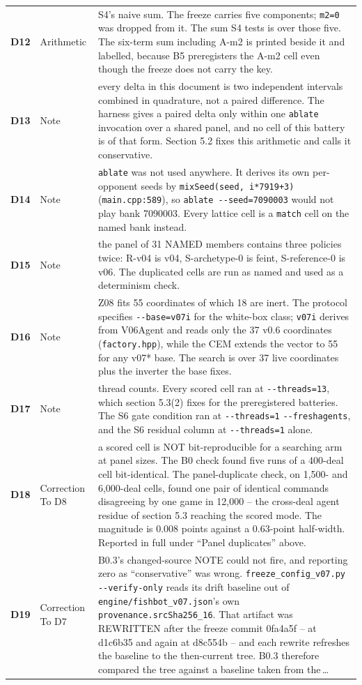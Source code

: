 \begin{xltabular}{\linewidth}{@{}l l L@{}}
\textbf{D12} & Arithmetic & S4's naive sum. The freeze carries five components; \texttt{m2=0} was dropped from it. The sum S4 tests is over those five. The six-term sum including A-m2 is printed beside it and labelled, because B5 preregisters the A-m2 cell even though the freeze does not carry the key. \\
\textbf{D13} & Note & every delta in this document is two independent intervals combined in quadrature, not a paired difference. The harness gives a paired delta only within one \texttt{ablate} invocation over a shared panel, and no cell of this battery is of that form. Section 5.2 fixes this arithmetic and calls it conservative. \\
\textbf{D14} & Note & \texttt{ablate} was not used anywhere. It derives its own per-opponent seeds by \texttt{mixSeed(seed, i*7919+3)} (\texttt{main.cpp:589}), so \texttt{ablate -{}-seed=7090003} would not play bank 7090003. Every lattice cell is a \texttt{match} cell on the named bank instead. \\
\textbf{D15} & Note & the panel of 31 NAMED members contains three policies twice: R-v04 is v04, S-archetype-0 is feint, S-reference-0 is v06. The duplicated cells are run as named and used as a determinism check. \\
\textbf{D16} & Note & Z08 fits 55 coordinates of which 18 are inert. The protocol specifies \texttt{-{}-base=v07i} for the white-box class; \texttt{v07i} derives from V06Agent and reads only the 37 v0.6 coordinates (\texttt{factory.hpp}), while the CEM extends the vector to 55 for any v07* base. The search is over 37 live coordinates plus the inverter the base fixes. \\
\textbf{D17} & Note & thread counts. Every scored cell ran at \texttt{-{}-threads=13}, which section 5.3(2) fixes for the preregistered batteries. The S6 gate condition ran at \texttt{-{}-threads=1} \texttt{-{}-freshagents}, and the S6 residual column at \texttt{-{}-threads=1} alone. \\
\textbf{D18} & Correction To D8 & a scored cell is NOT bit-reproducible for a searching arm at panel sizes. The B0 check found five runs of a 400-deal cell bit-identical. The panel-duplicate check, on 1,500- and 6,000-deal cells, found one pair of identical commands disagreeing by one game in 12,000 -- the cross-deal agent residue of section 5.3 reaching the scored mode. The magnitude is 0.008 points against a 0.63-point half-width. Reported in full under ``Panel duplicates'' above. \\
\textbf{D19} & Correction To D7 & B0.3's changed-source NOTE could not fire, and reporting zero as ``conservative'' was wrong. \texttt{freeze\_config\_v07.py -{}-verify-only} reads its drift baseline out of \texttt{engine/fishbot\_v07.json}'s own \texttt{provenance.srcSha256\_16}. That artifact was REWRITTEN after the freeze commit 0fa4a5f -- at d1c6b35 and again at d8c554b -- and each rewrite refreshes the baseline to the then-current tree. B0.3 therefore compared the tree against a baseline taken from the\,\ldots \\

\end{xltabular}
